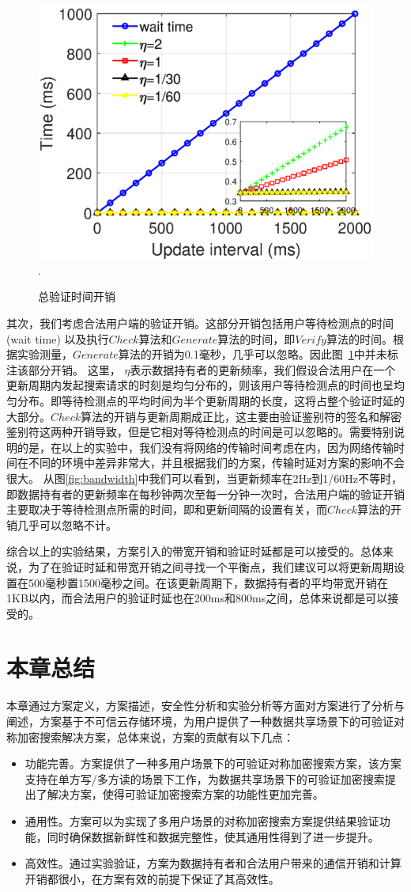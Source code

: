 \begin{figure}[h]
\centering
\includegraphics[width=3.5 in]{expr/verify-2}
\DeclareGraphicsExtensions.
\caption{总验证时间开销}
\label{fig:verify-2}
\end{figure}
其次，我们考虑合法用户端的验证开销。这部分开销包括用户等待检测点的时间 (wait time) 以及执行$Check$算法和$Generate$算法的时间，即$Verify$算法的时间。根据实验测量，$Generate$算法的开销为0.1毫秒，几乎可以忽略。因此图~\ref{fig:verify-2}中并未标注该部分开销。
这里， $\eta$表示数据持有者的更新频率，我们假设合法用户在一个更新周期内发起搜索请求的时刻是均匀分布的，则该用户等待检测点的时间也呈均匀分布。即等待检测点的平均时间为半个更新周期的长度，这将占整个验证时延的大部分。$Check$算法的开销与更新周期成正比，这主要由验证鉴别符的签名和解密鉴别符这两种开销导致，但是它相对等待检测点的时间是可以忽略的。需要特别说明的是，在以上的实验中，我们没有将网络的传输时间考虑在内，因为网络传输时间在不同的环境中差异非常大，并且根据我们的方案，传输时延对方案的影响不会很大。
从图\ref{fig:bandwidth}中我们可以看到，当更新频率在2Hz到1/60Hz不等时，即数据持有者的更新频率在每秒钟两次至每一分钟一次时，合法用户端的验证开销主要取决于等待检测点所需的时间，即和更新间隔的设置有关，而$Check$算法的开销几乎可以忽略不计。

综合以上的实验结果，\multi 方案引入的带宽开销和验证时延都是可以接受的。总体来说，为了在验证时延和带宽开销之间寻找一个平衡点，我们建议可以将更新周期设置在500毫秒置1500毫秒之间。在该更新周期下，数据持有者的平均带宽开销在1KB以内，而合法用户的验证时延也在200ms和800ms之间，总体来说都是可以接受的。

\section{本章总结}
本章通过方案定义，方案描述，安全性分析和实验分析等方面对\multi 方案进行了分析与阐述，\multi 方案基于不可信云存储环境，为用户提供了一种数据共享场景下的可验证对称加密搜索解决方案，总体来说，\multi 方案的贡献有以下几点：
\begin{itemize}
  \item 功能完善。\multi 方案提供了一种多用户场景下的可验证对称加密搜索方案，该方案支持在单方写/多方读的场景下工作，为数据共享场景下的可验证加密搜索提出了解决方案，使得可验证加密搜索方案的功能性更加完善。
  \item 通用性。\multi 方案可以为实现了多用户场景的对称加密搜索方案提供结果验证功能，同时确保数据新鲜性和数据完整性，使其通用性得到了进一步提升。
  \item 高效性。通过实验验证，\multi 方案为数据持有者和合法用户带来的通信开销和计算开销都很小，在方案有效的前提下保证了其高效性。
\end{itemize}
